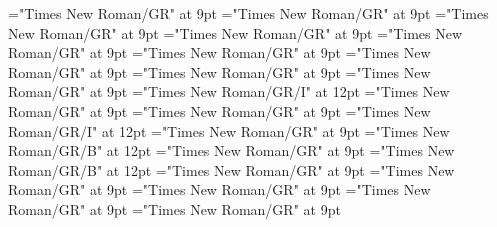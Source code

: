\documentclass[gps1,twoside]{article}
\begin{document}
\font\spantranslationtranslationtranslationsexampleexamplessensesensessubentrysubentriesentrylastchildafter="Times New Roman/GR" at 9pt
\font\spanspanencyclopedicinfosensesensessubentrysubentriesentrybefore="Times New Roman/GR" at 9pt
\font\spanencyclopedicinfosensesensessubentrysubentriesentryfirstchildbefore="Times New Roman/GR" at 9pt
\font\spanencyclopedicinfosensesensessubentrysubentriesentrylastchildafter="Times New Roman/GR" at 9pt
\font\spanspanrestrictionssensesensessubentrysubentriesentrybefore="Times New Roman/GR" at 9pt
\font\spanrestrictionssensesensessubentrysubentriesentryfirstchildbefore="Times New Roman/GR" at 9pt
\font\spanrestrictionssensesensessubentrysubentriesentrylastchildafter="Times New Roman/GR" at 9pt
\font\spanspanlexsensereferencessensesensessubentrysubentriesentrybefore="Times New Roman/GR" at 9pt
\font\lexsensereferencessensesensessubentrysubentriesentryafter="Times New Roman/GR" at 9pt
\font\spanenownertypeabbreviationlexsensereferencelexsensereferencessensesensessubentrysubentriesentry="Times New Roman/GR/I" at 12pt
\font\spanspanownertypeabbreviationlexsensereferencelexsensereferencessensesensessubentrysubentriesentrybefore="Times New Roman/GR" at 9pt
\font\spanownertypeabbreviationlexsensereferencelexsensereferencessensesensessubentrysubentriesentrylastchildafter="Times New Roman/GR" at 9pt
\font\spanownertypeabbreviationlexsensereferencelexsensereferencessensesensessubentrysubentriesentry="Times New Roman/GR/I" at 12pt
\font\configtargetconfigtargetconfigtargetslexsensereferencelexsensereferencessensesensessubentrysubentriesentrybefore="Times New Roman/GR" at 9pt
\font\spanbzhheadwordconfigtargetconfigtargetslexsensereferencelexsensereferencessensesensessubentrysubentriesentry="Times New Roman/GR/B" at 12pt
\font\spanspanheadwordconfigtargetconfigtargetslexsensereferencelexsensereferencessensesensessubentrysubentriesentrybefore="Times New Roman/GR" at 9pt
\font\spanheadwordconfigtargetconfigtargetslexsensereferencelexsensereferencessensesensessubentrysubentriesentry="Times New Roman/GR/B" at 12pt
\font\variantformentrybackrefvariantformentrybackrefvariantformentrybackrefssensesensessubentrysubentriesentrybefore="Times New Roman/GR" at 9pt
\font\variantformentrybackrefssensesensessubentrysubentriesentrybefore="Times New Roman/GR" at 9pt
\font\variantformentrybackrefssensesensessubentrysubentriesentryafter="Times New Roman/GR" at 9pt
\font\variantentrytypevariantentrytypevariantentrytypesvariantformentrybackrefvariantformentrybackrefssensesensessubentrysubentriesentrybefore="Times New Roman/GR" at 9pt
\font\variantentrytypesvariantformentrybackrefvariantformentrybackrefssensesensessubentrysubentriesentryafter="Times New Roman/GR" at 9pt
\end{document}
